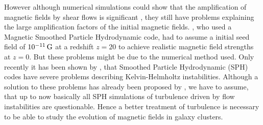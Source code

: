 However although numerical simulations could show that the amplification of
magnetic fields by shear flows is significant
\citep{Dolag2005a,Bruggen2005}, they still have problems explaining the large
amplification factors of the initial magnetic fields. \citet{Dolag2005a}, who
used a Magnetic Smoothed Particle Hydrodynamic code, had to assume a initial
seed field of $\unit[10^{-11}]{G}$ at a redshift $z=20$ to achieve realistic
magnetic field strengths at $z=0$. But these problems might be due to the
numerical method used. Only recently it has been shown by \citet{Agertz2007},
that Smoothed Particle Hydrodynamic (SPH) codes have severe problems describing
Kelvin-Helmholtz instabilities. Although a solution to these problems has
already been proposed by \citet{Price2007}, we have to assume, that up
to now basically all SPH simulations of turbulence driven by flow instabilities
are questionable. Hence a better treatment of turbulence is necessary to
be able to study the evolution of magnetic fields in galaxy clusters. 

